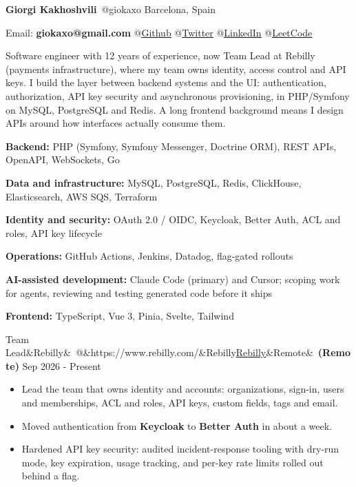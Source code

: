 \documentclass[10pt]{article}
\makeatletter
\newcommand{\weblink}[2]{\href{#1}{\textcolor{linkblue}{\underline{#2}}}}
\newcommand{\resumesection}[1]{\vspace{9pt}{\small\bfseries\textls{\MakeUppercase{#1}}}\par\vspace{3pt}}
\newcommand{\role}[5]{%
  \vspace{5pt}\par\noindent
  {\normalsize #1\ifx&#2&\else\ @\ifx&#3&#2\else\weblink{#3}{#2}\fi\fi\ifx&#4&\else\ \textbf{(#4)}\fi}%
  \hfill{\footnotesize #5}\par\nopagebreak\vspace{1pt}}
\makeatother
\begin{document}
\small

{\Large\bfseries Giorgi Kakhoshvili}\ {\large @giokaxo} \hfill Barcelona, Spain\par
\vspace{3pt}
Email: \textbf{giokaxo@gmail.com} \hfill {\footnotesize
@\weblink{https://github.com/giokaxo}{Github}
@\weblink{https://twitter.com/giokaxo}{Twitter}
@\weblink{https://www.linkedin.com/in/giorgi-kakhoshvili/}{LinkedIn}
@\weblink{https://leetcode.com/u/giokaxo/}{LeetCode}}\par

\resumesection{Summary}
Software engineer with 12 years of experience, now Team Lead at Rebilly (payments infrastructure), where my team owns identity, access control and API keys. I build the layer between backend systems and the UI: authentication, authorization, API key security and asynchronous provisioning, in PHP/Symfony on MySQL, PostgreSQL and Redis. A long frontend background means I design APIs around how interfaces actually consume them.\par

\resumesection{Skills}
\textbf{Backend:} PHP (Symfony, Symfony Messenger, Doctrine ORM), REST APIs, OpenAPI, WebSockets, Go\par
\textbf{Data and infrastructure:} MySQL, PostgreSQL, Redis, ClickHouse, Elasticsearch, AWS SQS, Terraform\par
\textbf{Identity and security:} OAuth 2.0 / OIDC, Keycloak, Better Auth, ACL and roles, API key lifecycle\par
\textbf{Operations:} GitHub Actions, Jenkins, Datadog, flag-gated rollouts\par
\textbf{AI-assisted development:} Claude Code (primary) and Cursor; scoping work for agents, reviewing and testing generated code before it ships\par
\textbf{Frontend:} TypeScript, Vue 3, Pinia, Svelte, Tailwind\par

\resumesection{Experience}

\role{Team Lead}{Rebilly}{https://www.rebilly.com/}{Remote}{Sep 2026 - Present}
\begin{itemize}
  \item Lead the team that owns identity and accounts: organizations, sign-in, users and memberships, ACL and roles, API keys, custom fields, tags and email.
  \item Moved authentication from \textbf{Keycloak} to \textbf{Better Auth} in about a week.
  \item Hardened API key security: audited incident-response tooling with dry-run mode, key expiration, usage tracking, and per-key rate limits rolled out behind a flag.
\end{itemize}
\end{document}
